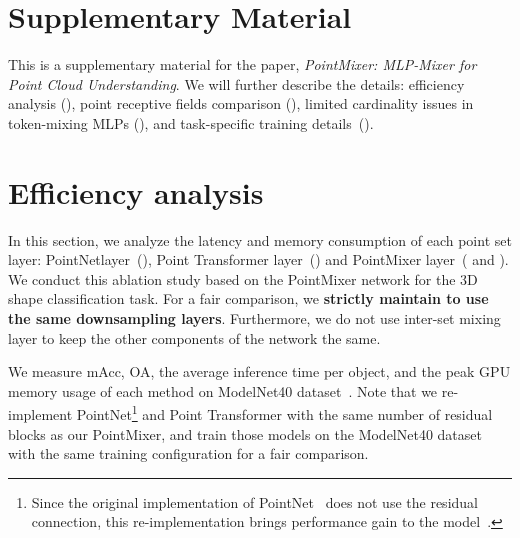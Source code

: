 \appendix
\section*{Supplementary Material}
This is a supplementary material for the paper, \textit{PointMixer: MLP-Mixer for Point Cloud Understanding}. We will further describe the details: 
efficiency analysis (), 
point receptive fields comparison (), 
limited cardinality issues in token-mixing MLPs (), 
and task-specific training details~(). 
\section{Efficiency analysis}
\label{sec:efficiency}
In this section, we analyze the latency and memory consumption of each point set layer: PointNet\plusplus layer~(), Point Transformer layer~() and PointMixer layer~( and ). We conduct this ablation study based on the PointMixer network for the 3D shape classification task. 
For a fair comparison, we \textbf{strictly maintain to use the same downsampling layers}.
Furthermore, we do not use inter-set mixing layer to keep the other components of the network the same.




We measure mAcc, OA, the average inference time per object, and the peak GPU memory usage of each method on ModelNet40 dataset~\cite{modelnet40}.
Note that we re-implement PointNet\plusplus\footnote{Since the original implementation of PointNet\plusplus~\cite{pointnet++} does not use the residual connection, this re-implementation brings performance gain to the model~\cite{pointnet++}.} and Point Transformer with the same number of residual blocks as our PointMixer, and train those models on the ModelNet40 dataset~\cite{modelnet40} with the same training configuration for a fair comparison.

